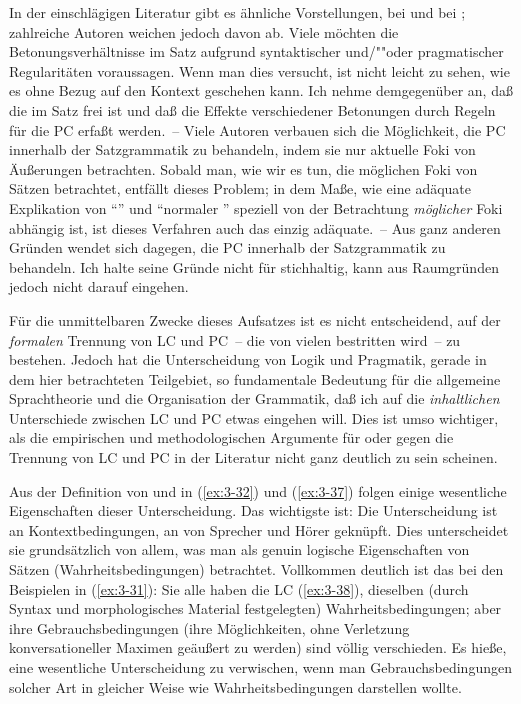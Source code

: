 \documentclass[output=paper]{langsci/langscibook}
\begin{document}
In der einschlägigen Literatur gibt es ähnliche Vorstellungen, \zb bei \citet{Bartsch76} und bei \citet{Rochemont78}; zahlreiche Autoren weichen jedoch davon ab. Viele möchten die Betonungsverhältnisse im Satz aufgrund syntaktischer \mbox{und}/""oder pragmatischer Regularitäten voraussagen. Wenn man dies versucht, ist nicht leicht zu sehen, wie es ohne Bezug auf den Kontext geschehen kann. Ich nehme demgegenüber an, daß die  im Satz frei ist und daß die Effekte verschiedener Betonungen durch Regeln für die PC erfaßt werden.~-- Viele Autoren verbauen sich die Möglichkeit, die PC innerhalb der Satzgrammatik zu behandeln, indem sie nur aktuelle Foki von Äußerungen betrachten. Sobald man, wie wir es tun, die möglichen Foki von Sätzen betrachtet, entfällt dieses Problem; in dem Maße, wie eine adäquate Explikation von "`"' und "`normaler "' speziell von der Betrachtung \textit{möglicher} Foki abhängig ist, ist dieses Verfahren auch das einzig adäquate.~-- Aus ganz anderen Gründen wendet \citet{Verhagen79} sich dagegen, die PC innerhalb der Satzgrammatik zu behandeln. Ich halte seine Gründe nicht für stichhaltig, kann aus Raumgründen jedoch nicht darauf eingehen.

\largerpage
  Für die unmittelbaren Zwecke dieses Aufsatzes ist es nicht
  entscheidend, auf der \textit{formalen} Trennung von LC und PC~-- die von
  vielen bestritten wird~-- zu bestehen. Jedoch hat die Unterscheidung
  von Logik und Pragmatik, gerade in dem hier betrachteten Teilgebiet,
  so fundamentale Bedeutung für die allgemeine Sprachtheorie und die
  Organisation der Grammatik, daß ich auf die \textit{inhaltlichen}
  Unterschiede zwischen LC und PC etwas eingehen will. Dies ist umso
  wichtiger, als die empirischen und methodologischen Argumente für
  oder gegen die Trennung von LC und PC in der Literatur nicht ganz
  deutlich zu sein scheinen.

  Aus der Definition von  und  in (\ref{ex:3-32}) und (\ref{ex:3-37}) folgen
  einige wesentliche Eigenschaften dieser Unterscheidung. Das
  wichtigste ist: Die Unterscheidung ist an Kontextbedingungen,
  \dash an  von Sprecher und Hörer geknüpft. Dies
  unterscheidet sie grundsätzlich von allem, was man als genuin
  logische Eigenschaften von Sätzen (Wahrheitsbedingungen)
  betrachtet. Vollkommen deutlich ist das bei den Beispielen in (\ref{ex:3-31}):
  Sie alle haben die LC (\ref{ex:3-38}), \dash dieselben (durch Syntax und
  morphologisches Material festgelegten) Wahrheitsbedingungen; aber
  ihre Gebrauchsbedingungen (ihre Möglichkeiten, ohne Verletzung
  konversationeller Maximen geäußert zu werden) sind völlig
  verschieden. Es hieße, eine wesentliche Unterscheidung zu
  verwischen, wenn man Gebrauchsbedingungen solcher Art in gleicher
  Weise wie Wahrheitsbedingungen darstellen wollte.
\end{document}

